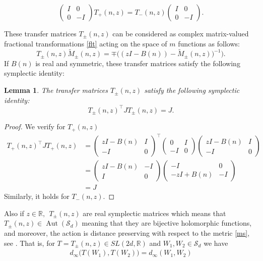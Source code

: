 \documentclass[reqno]{amsart}
\numberwithin{equation}{section}
\newcommand{\R}{\mathbb{R}}
\newtheorem{lemma}{Lemma}[section]
\begin{document}
 \begin{equation}\label{tm2} \begin{pmatrix} I & 0 \\ 0 & -I \end{pmatrix}	T_{+}(n,z)  = T_{-}(n,z)   \begin{pmatrix} I & 0 \\ 0 & -I \end{pmatrix}.\end{equation}

These transfer matrices $T_{\pm}(n,z)$ can be considered as complex matrix-valued fractional transformations \eqref{flt} acting on the space of $m$ functions as follows:
\begin{equation*}
	T_{\pm}(n,z)\tilde M_{\pm}(n,z) = \mp \Big( (z I -B(n)) - \tilde M_{\pm}(n,z))^{-1} \Big).
\end{equation*}
If $B(n)$ is real and symmetric, these transfer matrices satisfy the following symplectic identity:
\begin{lemma} The transfer matrices $ T_{\pm}(n, z) $ satisfy the following symplectic identity: $$ T_{\pm}(n, z)^\top J T_{\pm}(n,z ) = J .$$ \end{lemma}
\begin{proof} We verify for $T_+(n,z)$
\begin{align*} T_+(n,z)^\top J T_+(n,z)  & = \begin{pmatrix} z I -B(n) &   I \\ - I  & 0 \end{pmatrix}^\top \begin{pmatrix} 0 & I \\ -I & 0 \end{pmatrix} \begin{pmatrix} z I -B(n) &   I \\ - I  & 0 \end{pmatrix}  \\ & =
\begin{pmatrix} z I -B(n) &   -I \\  I  & 0 \end{pmatrix} \begin{pmatrix}-I &   0 \\  -zI+B(n)  & -I \end{pmatrix} \\ & = J\end{align*} 
Similarly, it holds for $T_-(n,z).$
\end{proof}
Also if $z\in \R,\ \ T_{\pm}(n, z)$ are real symplectic matrices which means that  $ T_{\pm}(n, z) \in \operatorname{Aut}{(\mathcal S_d)}$ meaning that they are bijective holomorphic functions, and moreover, the action is distance preserving with respect to the metric \eqref{ms}, see \cite{KM1}. That is, for $ T = T_{\pm}(n, z) \in SL(2d, \R) $ and  $W_1, W_2 \in \mathcal S_d $ we have 
 		\begin{align} \label{dp2} d_{\infty} \Big(T( W_1), T( W_2 )\Big) = d_{\infty}( W_1, W_2) \end{align}   
\end{document}
